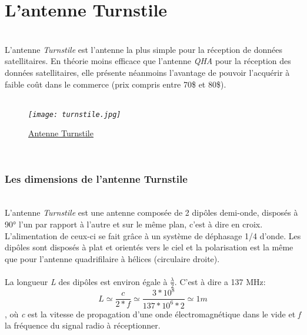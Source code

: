 \documentclass[12pt,fleqn]{book} %
\begin{document}
\section{L'antenne Turnstile}
~\\\indent L'antenne \emph{Turnstile} est l'antenne la plus simple pour la réception de données satellitaires. En théorie moins efficace que l'antenne \emph{QHA} pour la réception des données satellitaires, elle présente néanmoins l'avantage de pouvoir l'acquérir à faible coût dans le commerce (prix compris entre 70\$ et 80\$).
~\\\\
\begin{figure}[H]
	\centering
	\itshape
	\texttt{[image: turnstile.jpg]}
	\caption{\label{turnstile} \underline{Antenne Turnstile}}
\end{figure}
~\\
\subsubsection{Les dimensions de l'antenne Turnstile}
~\\L'antenne \emph{Turnstile} est une antenne composée de 2 dipôles demi-onde, disposés à 90° l'un par rapport à l'autre et sur le même plan, c'est à dire en croix. L'alimentation de ceux-ci se fait grâce à un système de déphasage 1/4 d'onde. Les dipôles sont disposés à plat et orientés vers le ciel et la polarisation est la même que pour l'antenne quadrifilaire à hélices (circulaire droite).
~\\\\La longueur \emph{L} des dipôles est environ égale à \(\frac{\lambda}{2}\). C'est à dire a 137 MHz:
$$ L\simeq\frac{c}{2*f}\simeq \frac{3*10^8}{137*10^6*2}\simeq1 m$$, où \emph{c} est la vitesse de propagation d'une onde électromagnétique dans le vide et \emph{f} la fréquence du signal radio à réceptionner.
~\\\\
\end{document}
